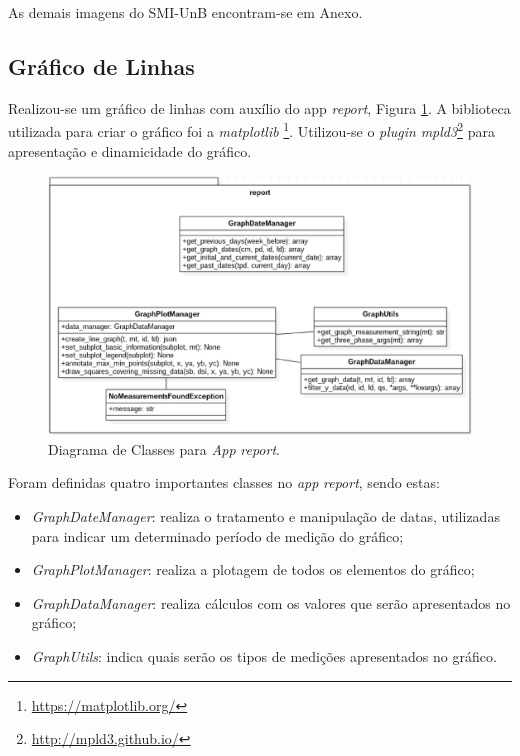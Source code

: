 As demais imagens do SMI-UnB encontram-se em Anexo.

\subsection{Gráfico de Linhas}
Realizou-se um gráfico de linhas com auxílio do app \textit{report}, Figura \ref{app_report}. A biblioteca utilizada para criar o gráfico foi a \textit{matplotlib} \footnote{\url{https://matplotlib.org/}}. Utilizou-se o \textit{plugin} \textit{mpld3}\footnote{\url{http://mpld3.github.io/}} para apresentação e dinamicidade do gráfico.

\begin{figure}[!h]
    \centering
    \includegraphics[keepaspectratio=true,scale=0.6]{figuras/app_report.eps}
    \caption{Diagrama de Classes para \textit{App} \textit{report}.}
    \label{app_report}
\end{figure}

Foram definidas quatro importantes classes no \textit{app} \textit{report}, sendo estas:

\begin{itemize}
    \item \textit{GraphDateManager}: realiza o tratamento e manipulação de datas, utilizadas para indicar um determinado período de medição do gráfico;
    \item \textit{GraphPlotManager}: realiza a plotagem de todos os elementos do gráfico;
    \item \textit{GraphDataManager}: realiza cálculos com os valores que serão apresentados no gráfico;
    \item \textit{GraphUtils}: indica quais serão os tipos de medições apresentados no gráfico.
\end{itemize}

